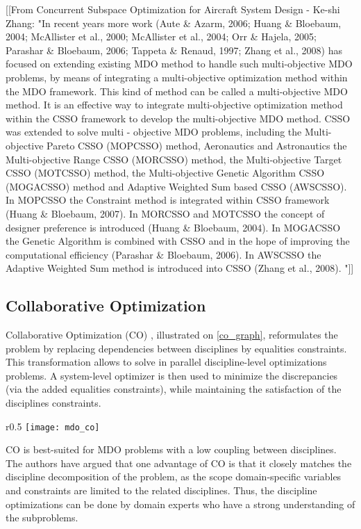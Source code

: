 [[From Concurrent Subspace Optimization for Aircraft System Design -  Ke-shi Zhang:
"In recent years more work (Aute \& Azarm, 2006; Huang \& Bloebaum, 2004; McAllister et al., 2000; McAllister et al., 2004; Orr \& Hajela, 2005; Parashar \& Bloebaum, 2006; Tappeta \& Renaud, 1997; Zhang et al., 2008) has focused on extending existing MDO method to handle such multi-objective MDO problems, by means of integrating a multi-objective optimization method within the MDO framework. This kind of method can be called a multi-objective MDO method.
It is an effective way to integrate multi-objective optimization method within the CSSO framework to develop the multi-objective MDO method. CSSO was extended to solve multi - objective MDO problems, including the Multi-objective Pareto CSSO (MOPCSSO) method, Aeronautics and Astronautics the Multi-objective Range CSSO (MORCSSO) method, the Multi-objective Target CSSO (MOTCSSO) method, the Multi-objective Genetic Algorithm CSSO (MOGACSSO) method and Adaptive Weighted Sum based CSSO (AWSCSSO). In MOPCSSO the Constraint method is integrated within CSSO framework (Huang \& Bloebaum, 2007). In MORCSSO and MOTCSSO the concept of designer preference is introduced (Huang \& Bloebaum, 2004). In MOGACSSO the Genetic Algorithm is combined with CSSO and in the hope of improving the computational efficiency (Parashar \& Bloebaum, 2006). In AWSCSSO the Adaptive Weighted Sum method is introduced into CSSO (Zhang et al., 2008). "]]

\subsection{Collaborative Optimization}

Collaborative Optimization (CO) \cite{Ilan:1994:MOM:887207}, illustrated on \figurename{} \ref{co_graph}, reformulates the problem by replacing dependencies between disciplines by equalities constraints. This transformation allows to solve in parallel discipline-level optimizations problems. A system-level optimizer is then used to minimize the discrepancies (via the added equalities constraints), while maintaining the satisfaction of the disciplines constraints.

\begin{wrapfigure}{r}{0.5\textwidth}
\centering
\texttt{[image: mdo\_co]}
\caption{CO method}\label{co_graph}
\end{wrapfigure}

CO is best-suited for MDO problems with a low coupling between disciplines. The authors have argued that one advantage of CO is that it closely matches the discipline decomposition of the problem, as the scope domain-specific variables and constraints are limited to the related disciplines. Thus, the discipline optimizations can be done by domain experts  who have a strong understanding of the subproblems.

